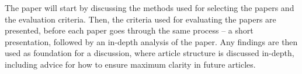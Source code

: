The paper will start by discussing the methods used for selecting the papers and the evaluation criteria. Then, the criteria used for evaluating the papers are presented, before each paper goes through the same process -- a short presentation, followed by an in-depth analysis of the paper. Any findings are then used as foundation for a discussion, where article structure is discussed in-depth, including advice for how to ensure maximum clarity in future articles.